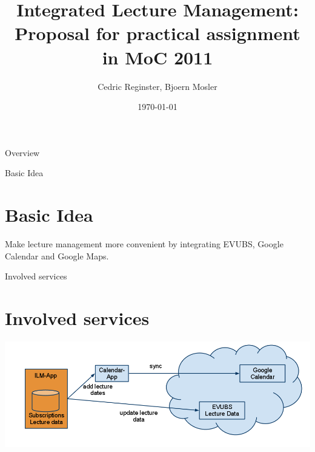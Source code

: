\documentclass{beamer}
\title[Integrated Lecture Management]{Integrated Lecture Management: Proposal for practical assignment in MoC 2011}
\date{\today}
\institute{IAM}
\author{Cedric Reginster, Bjoern Mosler}
\begin{document}
\begin{frame}
	\titlepage
\end{frame}


\begin{frame}{Overview}
	\tableofcontents
\end{frame}

\begin{frame}{Basic Idea}

	\section{Basic Idea}
	Make lecture management more convenient by integrating EVUBS, Google Calendar and Google Maps.


\end{frame}

\begin{frame}{Involved services}
	\section{Involved services}

	\begin{center}
		\includegraphics[scale=0.35]{architecture.png}
	\end{center}
	
\end{frame}
\end{document}
